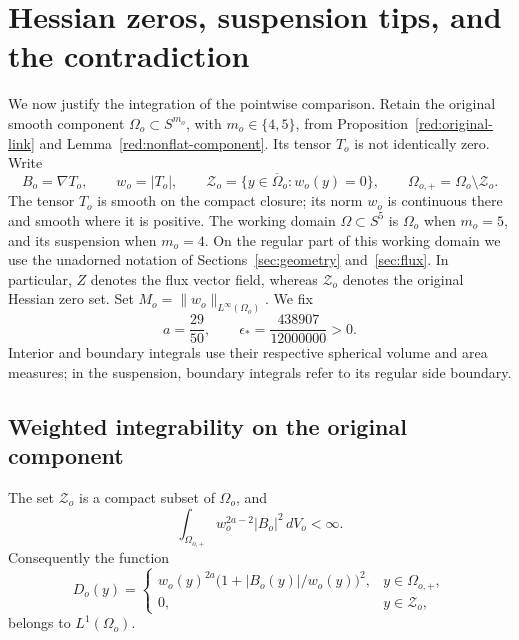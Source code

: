 \section{Hessian zeros, suspension tips, and the contradiction}
\label{cut:section}
\label{sec:cutoffs}

We now justify the integration of the pointwise comparison.  Retain the
original smooth component $\Omega_o\subset S^{m_o}$, with $m_o\in\{4,5\}$,
from Proposition~\ref{red:original-link} and Lemma~\ref{red:nonflat-component}.
Its tensor $T_o$ is not identically zero.  Write
\[
 B_o=\nabla T_o,\qquad w_o=|T_o|,\qquad
 \mathcal Z_o=\{y\in\overline\Omega_o:w_o(y)=0\},\qquad
 \Omega_{o,+}=\Omega_o\setminus\mathcal Z_o.
\]
The tensor $T_o$ is smooth on the compact closure; its norm $w_o$ is
continuous there and smooth where it is positive.  The working domain
$\Omega\subset S^5$ is $\Omega_o$ when $m_o=5$, and its suspension when
$m_o=4$.  On the regular part of this working domain we use the unadorned
notation of Sections~\ref{sec:geometry} and~\ref{sec:flux}.
In particular, $Z$ denotes the flux
vector field, whereas $\mathcal Z_o$ denotes the original Hessian zero set.
Set $M_o=\|w_o\|_{L^\infty(\Omega_o)}$.
We fix
\[
 a=\frac{29}{50},\qquad
 \epsilon_* =\frac{438907}{12000000}>0.
\]
Interior and boundary integrals use their respective spherical volume and
area measures; in the suspension, boundary integrals refer to its regular
side boundary.

\subsection{Weighted integrability on the original component}

\begin{lemma}\label{cut:weighted-bochner}
The set $\mathcal Z_o$ is a compact subset of $\Omega_o$, and
\begin{equation}\label{cut:weighted-integrability}
 \int_{\Omega_{o,+}}w_o^{2a-2}|B_o|^2\,dV_o<\infty.
\end{equation}
Consequently the function
\begin{equation}\label{cut:original-dominator}
 D_o(y)=
 \begin{cases}
  w_o(y)^{2a}\bigl(1+|B_o(y)|/w_o(y)\bigr)^2,
       &y\in\Omega_{o,+},\\
  0,&y\in\mathcal Z_o,
 \end{cases}
\end{equation}
belongs to $L^1(\Omega_o)$.
\end{lemma}

